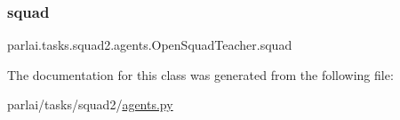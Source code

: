 \subsubsection{\texorpdfstring{squad}{squad}}
{\footnotesize\ttfamily parlai.\+tasks.\+squad2.\+agents.\+Open\+Squad\+Teacher.\+squad}



The documentation for this class was generated from the following file\+:\begin{DoxyCompactItemize}
\item 
parlai/tasks/squad2/\hyperlink{parlai_2tasks_2squad2_2agents_8py}{agents.\+py}\end{DoxyCompactItemize}
